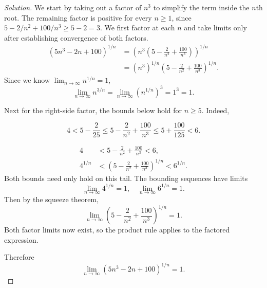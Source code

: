 \begin{proof}[Solution]
  We start by taking out a factor of $n^3$ to simplify the term inside the
  $n$th root.
  The remaining factor is positive for every $n\ge1$,
  since $5-2/n^2+100/n^3\ge5-2=3$. We first factor at each $n$ and
  take limits only after establishing convergence of both factors.
  \begin{align*}
    (5n^3-2n+100)^{1/n}
      &=\left(n^3\left(5-\frac{2}{n^2}+\frac{100}{n^3}\right)\right)^{1/n}\\
      &=(n^3)^{1/n}\left(5-\frac{2}{n^2}+\frac{100}{n^3}\right)^{1/n}.
  \end{align*}
  Since we know $\lim_{n\to\infty}n^{1/n}=1$,
  \[
    \lim_{n\to\infty}n^{3/n}
      =\lim_{n\to\infty}(n^{1/n})^3=1^3=1.
  \]

  Next for the right-side factor, the bounds below
  hold for $n\ge5$. Indeed,

  \[
    4<5-\frac{2}{25}
      \le5-\frac{2}{n^2}+\frac{100}{n^3}
      \le5+\frac{100}{125}<6.
  \]

  \begin{align*}
    4&<5-\frac{2}{n^2}+\frac{100}{n^3}<6,\\
    4^{1/n}&<\left(5-\frac{2}{n^2}+\frac{100}{n^3}\right)^{1/n}<6^{1/n}.
  \end{align*}
  Both bounds need only hold on this tail.
  The bounding sequences have limits
  \[
    \lim_{n\to\infty}4^{1/n}=1,\quad
    \lim_{n\to\infty}6^{1/n}=1.
  \]
  Then by the squeeze theorem,
  \[
    \lim_{n\to\infty}\left(5-\frac{2}{n^2}+\frac{100}{n^3}\right)^{1/n}=1.
  \]
  Both factor limits now exist, so the product rule
  applies to the factored expression.

  Therefore
  \[
    \lim_{n\to\infty}(5n^3-2n+100)^{1/n}=1.
  \]

\end{proof}
